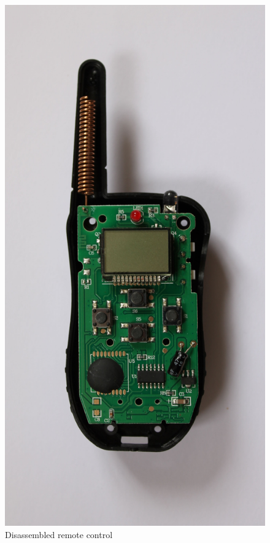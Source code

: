 \documentclass[a4paper]{article}
\begin{document}
\begin{figure}
	\centerline{\includegraphics[scale=0.1]{remotecontrol-top.jpeg}}
	\caption{\label{remotepcb}Disassembled remote control}
\end{figure}
\end{document}
